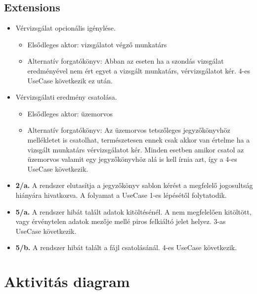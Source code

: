 \subsection{Extensions}
\begin{itemize}
	\item Vérvizsgálat opcionális igénylése.
		\begin{itemize}
			\item Elsődleges aktor: vizsgálatot végző munkatárs
			\item Alternatív forgatókönyv: Abban az eseten ha a szondás vizsgálat eredményével nem ért egyet a vizsgált munkatárs, vérvizsgálatot kér. 4-es UseCase következik ez után.
		\end{itemize}
	\item Vérvizsgálati eredmény csatolása.
		\begin{itemize}
			\item Elsődleges aktor: üzemorvos
			\item Alternatív forgatókönyv:  Az üzemorvos tetszőleges jegyzőkönyvhöz mellékletet is csatolhat, természetesen ennek csak akkor van értelme ha a vizsgált munkatárs vérvizsgálatot kér. Minden esetben amikor csatol az üzemorvos valamit egy jegyzőkönyvhöz alá is kell írnia azt, így a 4-es UseCase következik.
		\end{itemize}
	\item \textbf{2/a.} A rendszer elutasítja a jegyzőkönyv sablon kérést a megfelelő jogosultság hiányára hivatkozva. A folyamat a UseCase 1-es lépésétől folytatodik.
	\item \textbf{5/a.} A rendszer hibát talált adatok kitöltésénél. A nem megfelelően kitöltött, vagy érvénytelen adatok mezője mellé piros felkiáltó jelet helyez. 3-as UseCase következik.
	\item \textbf{5/b.} A rendszer hibát talált a fájl csatolásánál. 4-es UseCase következik.
\end{itemize}

\newpage
\section{Aktivitás diagram}

